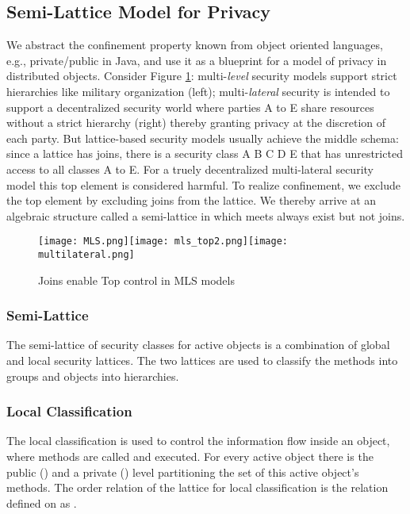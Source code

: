 \documentclass[10pt, conference, compsocconf]{IEEEtran}
\begin{document}
\subsection{Semi-Lattice Model for Privacy}
\label{sec:sml4mls}
We abstract the confinement property known from object oriented languages, e.g., 
private/public in Java,
and use it as a blueprint for a model of privacy in distributed objects. 
Consider Figure \ref{fig:mls}: multi-{\it level} security models support strict hierarchies 
like military  organization (left); multi-{\it lateral} security \cite[Ch. 8]{and:01} 
is intended to support a decentralized security world where 
parties A to E share resources without a strict hierarchy (right) thereby granting 
privacy at the discretion of each party. But lattice-based security models usually
achieve the middle schema: since a lattice 
has joins, there is a security class A  B  C  D  E 
that has unrestricted access to all 
classes A to E. For a truely decentralized multi-lateral security model 
this top element is considered harmful. 
To realize confinement, we exclude the top element by excluding joins from the lattice. 
We thereby arrive at an algebraic structure called a semi-lattice in which meets always 
exist but not joins.
\begin{figure}
\vspace{-3ex}
\begin{center}
\texttt{[image: MLS.png]}\texttt{[image: mls\_top2.png]}\texttt{[image: multilateral.png]}
\vspace{-2ex}
\caption{Joins enable Top control in MLS models}
\label{fig:mls}
\end{center}
\vspace{-3ex}
\end{figure}

\subsubsection*{Semi-Lattice}
The semi-lattice of security classes for active objects is a combination of
global and local security lattices. The two lattices are used to classify
the methods into groups and objects into hierarchies.

\subsubsection{Local Classification}
The local classification is used to control the information flow inside an
object, where methods are called and executed. For every active object there is the public () and a private
() level partitioning the set of this active object's methods. 
The order relation of the lattice for local classification is the relation  
defined on  as .
\end{document}
